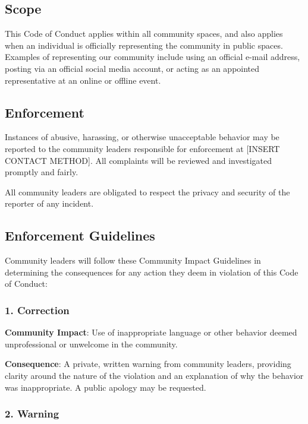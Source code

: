 \documentclass[
  fontsize=13pt,
  english,
  a4paper,
  openany, a4paper, oneside]{article}
\begin{document}
\hypertarget{scope}{%
\subsection{Scope}\label{scope}}

This Code of Conduct applies within all community spaces, and also applies when
an individual is officially representing the community in public spaces.
Examples of representing our community include using an official e-mail address,
posting via an official social media account, or acting as an appointed
representative at an online or offline event.

\hypertarget{enforcement}{%
\subsection{Enforcement}\label{enforcement}}

Instances of abusive, harassing, or otherwise unacceptable behavior may be
reported to the community leaders responsible for enforcement at
{[}INSERT CONTACT METHOD{]}.
All complaints will be reviewed and investigated promptly and fairly.

All community leaders are obligated to respect the privacy and security of the
reporter of any incident.

\hypertarget{enforcement-guidelines}{%
\subsection{Enforcement Guidelines}\label{enforcement-guidelines}}

Community leaders will follow these Community Impact Guidelines in determining
the consequences for any action they deem in violation of this Code of Conduct:

\hypertarget{correction}{%
\subsubsection{1. Correction}\label{correction}}

\textbf{Community Impact}: Use of inappropriate language or other behavior deemed
unprofessional or unwelcome in the community.

\textbf{Consequence}: A private, written warning from community leaders, providing
clarity around the nature of the violation and an explanation of why the
behavior was inappropriate. A public apology may be requested.

\hypertarget{warning}{%
\subsubsection{2. Warning}\label{warning}}
\end{document}
